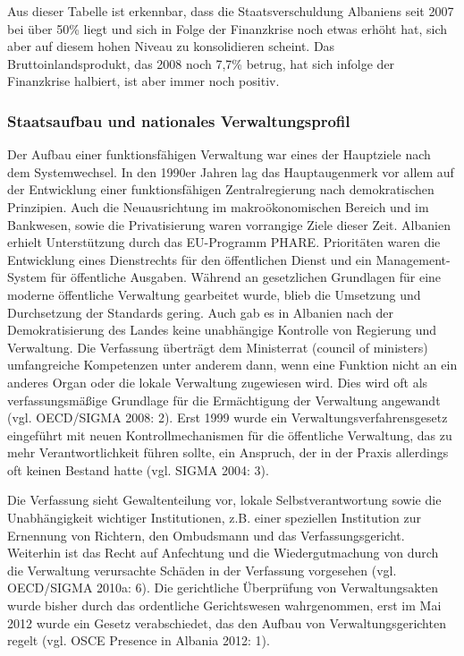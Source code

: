 Aus dieser Tabelle ist erkennbar, dass die Staatsverschuldung Albaniens seit 2007 bei über 50\% liegt und sich in Folge der Finanzkrise noch etwas erhöht hat, sich aber auf diesem hohen Niveau zu konsolidieren scheint. Das Bruttoinlandsprodukt, das 2008 noch 7,7\% betrug, hat sich infolge der Finanzkrise halbiert, ist aber immer noch positiv.

\subsubsection{Staatsaufbau und nationales Verwaltungsprofil}
Der Aufbau einer funktionsfähigen Verwaltung war eines der Hauptziele nach dem Systemwechsel. In den 1990er Jahren lag das Hauptaugenmerk vor allem auf der Entwicklung einer funktionsfähigen Zentralregierung nach demokratischen Prinzipien. Auch die Neuausrichtung im makroökonomischen Bereich und im Bankwesen, sowie die Privatisierung waren vorrangige Ziele dieser Zeit. Albanien erhielt Unterstützung durch das EU-Programm PHARE. Prioritäten waren die Entwicklung eines Dienstrechts für den öffentlichen Dienst und ein Management-System für öffentliche Ausgaben. Während an gesetzlichen Grundlagen für eine moderne öffentliche Verwaltung gearbeitet wurde, blieb die Umsetzung und Durchsetzung der Standards gering. Auch gab es in Albanien nach der Demokratisierung des Landes keine unabhängige Kontrolle von Regierung und Verwaltung. Die Verfassung überträgt dem Ministerrat (council of ministers) umfangreiche Kompetenzen unter anderem dann, wenn eine Funktion nicht an ein anderes Organ oder die lokale Verwaltung zugewiesen wird. Dies wird oft als verfassungsmäßige Grundlage für die Ermächtigung der Verwaltung angewandt (vgl. OECD/SIGMA 2008: 2). Erst 1999 wurde ein Verwaltungsverfahrensgesetz eingeführt mit neuen Kontrollmechanismen für die öffentliche Verwaltung, das zu mehr Verantwortlichkeit führen sollte, ein Anspruch, der in der Praxis allerdings oft keinen Bestand hatte (vgl. SIGMA 2004: 3).\par
Die Verfassung sieht Gewaltenteilung vor, lokale Selbstverantwortung sowie die Unabhängigkeit wichtiger Institutionen, z.B. einer speziellen Institution zur Ernennung von Richtern, den Ombudsmann und das Verfassungsgericht. Weiterhin ist das Recht auf Anfechtung und die Wiedergutmachung von durch die Verwaltung verursachte Schäden in der Verfassung vorgesehen (vgl. OECD/SIGMA 2010a: 6). Die gerichtliche Überprüfung von Verwaltungsakten wurde bisher durch das ordentliche Gerichtswesen wahrgenommen, erst im Mai 2012 wurde ein Gesetz verabschiedet, das den Aufbau von Verwaltungsgerichten regelt (vgl. OSCE Presence in Albania 2012: 1).\par
